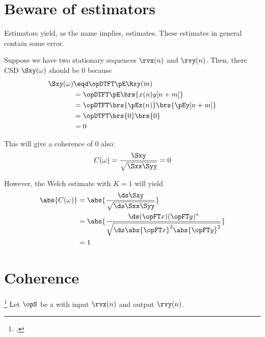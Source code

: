 \section{Beware of estimators}
Estimators yield, as the name implies, estimates.
These estimates in general contain some error.

\begin{example}[The K=1 Welch estimate of coherence]
Suppose we have two  stationary sequences $\rvx(n)$ and $\rvy(n)$. Then, there
CSD $\Sxy(\omega)$ should be $0$ because
\begin{align*}
  \Sxy(\omega)
    &\eqd \opDTFT\pE\Rxy(m)
  \\&=    \opDTFT\pE\brs{x(n)y[n+m]}
  \\&=    \opDTFT\brs{\pEx(n)} \brs{\pEy[n+m]}
  \\&=    \opDTFT\brs{0} \brs{0}
  \\&=    0
\end{align*}

This will give a coherence of $0$ also:
\[ C(\omega) = \frac{\Sxy}{\sqrt{\Sxx\Syy}} = 0\]

However, the Welch estimate with $K=1$ will yield
\begin{align*}
  \abs{C(\omega)}
    &= \abs{\frac{\ds\Sxy}{\sqrt{\ds\Sxx\Syy}}}
  \\&= \abs{\frac{\ds (\opFT x)(\opFT y)^\ast}{\sqrt{\ds\abs{\opFT x}^2\abs{\opFT y}^2}}}
  \\&= 1
\end{align*}

\end{example}



\section{Coherence}
\begin{definition}
\footnote{
  ,
  }
Let $\opS$ be a  with input $\rvx(n)$ and output $\rvy(n)$.
\end{definition}
